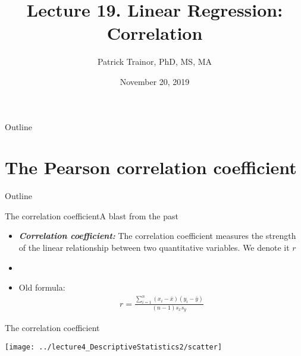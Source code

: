 \documentclass[xcolor=dvipsnames]{beamer}
\title[Lecture 20]{Lecture 19. Linear Regression: Correlation}
\author[Patrick Trainor]{Patrick Trainor, PhD, MS, MA}
\institute[NMSU]{New Mexico State University}
\date{November 20, 2019}
\begin{document}
\begin{frame}
\maketitle
\end{frame}

\begin{frame}{Outline}
\tableofcontents[hideallsubsections]
\end{frame}

\section{The Pearson correlation coefficient}
\begin{frame}{Outline}
	\tableofcontents[currentsection,subsectionstyle=show/shaded/hide]
\end{frame}

\begin{frame}{The correlation coefficient}{A blast from the past}
	\begin{itemize}
		\item \textbf{\emph{Correlation coefficient:}} The correlation coefficient measures the strength of the linear relationship between two quantitative variables. We denote it $r$
		\item[]
		\item Old formula: 
		\begin{gather*}
		r = \frac{\sum_{i=1}^n(x_i -\bar{x})(y_i - \bar{y})}{(n-1) s_x s_y}
		\end{gather*}
	\end{itemize}
\end{frame}

\begin{frame}{The correlation coefficient}
	\begin{center}
		\texttt{[image: ../lecture4\_DescriptiveStatistics2/scatter]}
	\end{center}
\end{frame}
\end{document}
